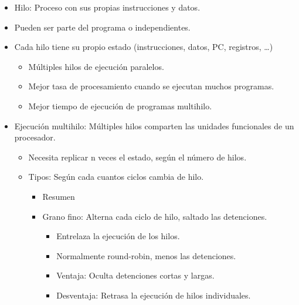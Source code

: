 \documentclass[12pt, twoside, openright]{report} %
\begin{document}
      \begin{itemize}
        \item
          Hilo: Proceso con sus propias instrucciones y datos.
        \item
          Pueden ser parte del programa o independientes.
        \item
          Cada hilo tiene su propio estado (instrucciones, datos, PC,
          registros, \ldots)

          \begin{itemize}
          
            \item
              Múltiples hilos de ejecución paralelos.
            \item
              Mejor tasa de procesamiento cuando se ejecutan muchos
              programas.
            \item
              Mejor tiempo de ejecución de programas multihilo.
          \end{itemize}
        \item
          Ejecución multihilo: Múltiples hilos comparten las unidades
          funcionales de un procesador.

          \begin{itemize}
          
            \item
            Necesita replicar n veces el estado, según el número de hilos.

            \item
            Tipos: Según cada cuantos ciclos cambia de hilo. 
            \begin{itemize}
              \item Resumen
              \begin{figure}[H]
                {\def\svgwidth{.8\textwidth}
                  }
              \end{figure}
              \item Grano fino: Alterna cada ciclo de hilo, saltado las detenciones.
              \begin{itemize}
                \item Entrelaza la ejecución de los hilos.
                \item Normalmente round-robin, menos las detenciones.
                \item Ventaja: Oculta detenciones cortas y largas.
                \item Desventaja: Retrasa la ejecución de hilos individuales.
              \end{itemize}
                  

\end{itemize}
\end{itemize}
\end{itemize}
\end{document}
